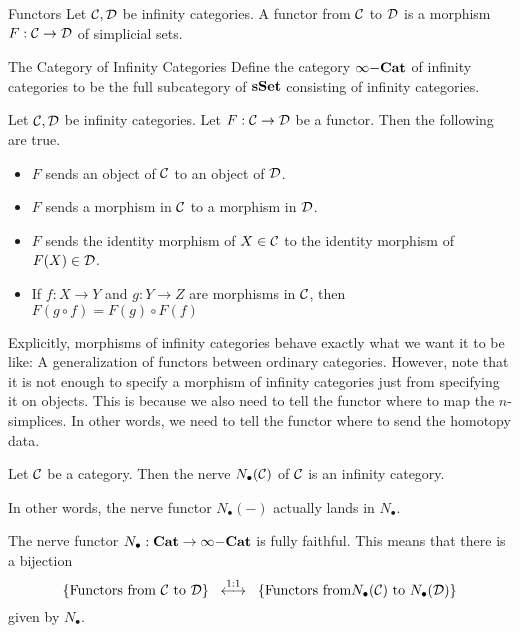 \documentclass[a4paper]{article}
\begin{document}
\begin{defn}{Functors}{} Let $\mathcal{C},\mathcal{D}$ be infinity categories. A functor from $\mathcal{C}$ to $\mathcal{D}$ is a morphism $F:\mathcal{C}\to\mathcal{D}$ of simplicial sets. 
\end{defn}

\begin{defn}{The Category of Infinity Categories}{} Define the category $\infty\bold{-Cat}$ of infinity categories to be the full subcategory of $\bold{sSet}$ consisting of infinity categories. 
\end{defn}

\begin{lmm}{}{} Let $\mathcal{C},\mathcal{D}$ be infinity categories. Let $F:\mathcal{C}\to\mathcal{D}$ be a functor. Then the following are true. 
\begin{itemize}
\item $F$ sends an object of $\mathcal{C}$ to an object of $\mathcal{D}$. 
\item $F$ sends a morphism in $\mathcal{C}$ to a morphism in $\mathcal{D}$. 
\item $F$ sends the identity morphism of $X\in\mathcal{C}$ to the identity morphism of $F(X)\in\mathcal{D}$. 
\item If $f:X\to Y$ and $g:Y\to Z$ are morphisms in $\mathcal{C}$, then $F(g\circ f)=F(g)\circ F(f)$
\end{itemize}
\end{lmm}

Explicitly, morphisms of infinity categories behave exactly what we want it to be like: A generalization of functors between ordinary categories. However, note that it is not enough to specify a morphism of infinity categories just from specifying it on objects. This is because we also need to tell the functor where to map the $n$-simplices. In other words, we need to tell the functor where to send the homotopy data. 

\begin{prp}{}{} Let $\mathcal{C}$ be a category. Then the nerve $N_\bullet(\mathcal{C})$ of $\mathcal{C}$ is an infinity category. 
\end{prp}

In other words, the nerve functor $N_\bullet(-)$ actually lands in $N_\bullet$. 

\begin{prp}{}{} The nerve functor $N_\bullet:\bold{Cat}\to\infty\bold{-Cat}$ is fully faithful. This means that there is a bijection $$\{\text{Functors from }\mathcal{C}\text{ to }\mathcal{D}\}\;\;\overset{1:1}{\longleftrightarrow}\;\;\{\text{Functors from}N_\bullet(\mathcal{C})\text{ to }N_\bullet(\mathcal{D})\}$$ given by $N_\bullet$. 
\end{prp}
\end{document}
